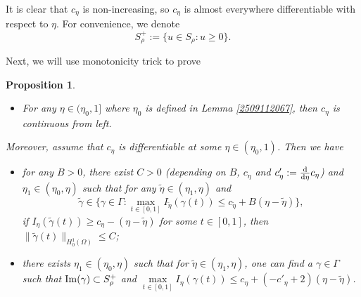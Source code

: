 \documentclass[10pt]{article}
\numberwithin{equation}{section}
\newtheorem{proposition}[theorem]{Proposition}
\newcommand{\ud}{\mathrm{d}}
\numberwithin{equation}{section}
\begin{document}
It is clear that $c_{\eta}$ is non-increasing, so $c_{\eta}$ is almost everywhere differentiable with respect to $\eta$.
For convenience, we denote
\[
S_\rho^+:=\{u\in S_\rho: u\ge 0\}.
\]

Next, we will use monotonicity trick to prove
\begin{proposition}\label{2408310238}
\begin{itemize}
\item[\rm (i)] For any $\eta\in (\eta_0, 1]$ where $\eta_0$ is defined in Lemma \ref{2509112067}, then $c_\eta$ is continuous from left.
\end{itemize}
\smallskip
 Moreover, assume that $c_{\eta}$ is differentiable at some $\eta\in (\eta_0, 1)$. Then  we have
\begin{itemize}
\item[\rm (ii)] for any $B>0$, there exist $C>0$ {\rm(}depending on $B$, $c_\eta$ and $c'_\eta:=\frac{\rm d}{\ud\eta}c_{\eta}${\rm)} and $\eta_1\in (\eta_0, \eta)$ such that for any $\widetilde{\eta}\in (\eta_1, \eta)$ and
\begin{equation}\label{2509180016}
\widetilde{\gamma}\in \{\gamma\in\Gamma: \max_{t\in [0, 1]}I_{\widetilde{\eta}}(\gamma(t))\le c_{\widetilde{\eta}}+B(\eta-\widetilde{\eta})\},
\end{equation}
 if $I_{\eta}(\widetilde{\gamma}(t))\ge c_\eta-(\eta-\widetilde{\eta})$ for some $t\in [0, 1]$, then $\|\widetilde{\gamma}(t)\|_{H_0^1(\Omega)}\le C$;
\item[\rm (iii)] there exists $\eta_1\in (\eta_0, \eta)$ such that for $\widetilde{\eta}\in (\eta_1, \eta)$, one can find a $\gamma\in \Gamma$ such that ${\rm Im}(\gamma)\subset S_\rho^+$ and $\underset{t\in [0, 1]}{\max}I_{\eta}(\gamma(t))\le c_\eta+(-c'_\eta+2)(\eta-\widetilde{\eta})$.
\end{itemize}
\end{proposition}
\end{document}

